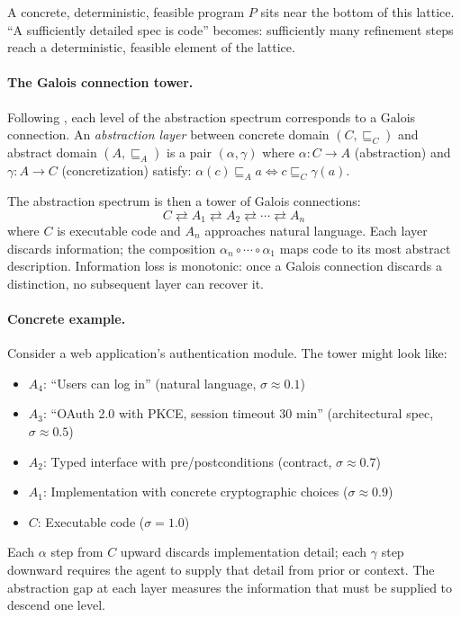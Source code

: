 \documentclass[11pt, a4paper]{googledeepmind}
\begin{document}
A concrete, deterministic, feasible program $P$ sits near the bottom of this lattice. ``A sufficiently detailed spec is code'' becomes: sufficiently many refinement steps reach a deterministic, feasible element of the lattice.

\paragraph{The Galois connection tower.} Following \citet{cousot1977abstract}, each level of the abstraction spectrum corresponds to a Galois connection. An \emph{abstraction layer} between concrete domain $(C, \sqsubseteq_C)$ and abstract domain $(A, \sqsubseteq_A)$ is a pair $(\alpha, \gamma)$ where $\alpha: C \to A$ (abstraction) and $\gamma: A \to C$ (concretization) satisfy: $\alpha(c) \sqsubseteq_A a \iff c \sqsubseteq_C \gamma(a)$.

The abstraction spectrum is then a tower of Galois connections:
\begin{equation}
    C \rightleftarrows A_1 \rightleftarrows A_2 \rightleftarrows \cdots \rightleftarrows A_n
\end{equation}
where $C$ is executable code and $A_n$ approaches natural language. Each layer discards information; the composition $\alpha_n \circ \cdots \circ \alpha_1$ maps code to its most abstract description. Information loss is monotonic: once a Galois connection discards a distinction, no subsequent layer can recover it.

\paragraph{Concrete example.} Consider a web application's authentication module. The tower might look like:
\begin{itemize}[nosep]
    \item $A_4$: ``Users can log in'' (natural language, $\sigma \approx 0.1$)
    \item $A_3$: ``OAuth 2.0 with PKCE, session timeout 30 min'' (architectural spec, $\sigma \approx 0.5$)
    \item $A_2$: Typed interface with pre/postconditions (contract, $\sigma \approx 0.7$)
    \item $A_1$: Implementation with concrete cryptographic choices ($\sigma \approx 0.9$)
    \item $C$: Executable code ($\sigma = 1.0$)
\end{itemize}
Each $\alpha$ step from $C$ upward discards implementation detail; each $\gamma$ step downward requires the agent to supply that detail from prior or context. The abstraction gap at each layer measures the information that must be supplied to descend one level.
\end{document}
